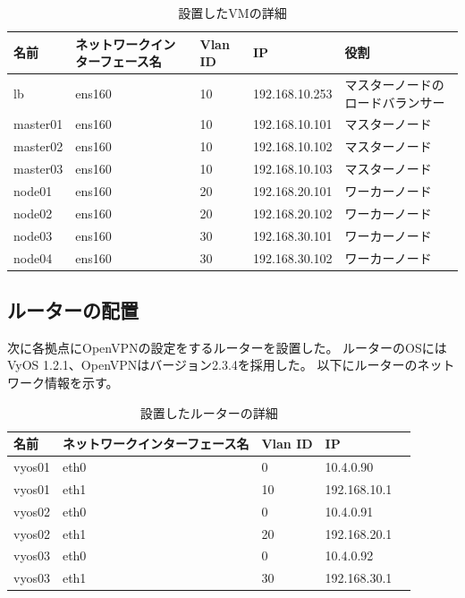 \begin{landscape}
  \begin{table}[htb]
    \begin{center}
      \caption{設置したVMの詳細}
      \begin{tabular}{|l|l|l|l|l|} \hline
        名前 & ネットワークインターフェース名 & Vlan ID & IP & 役割 \\ \hline
        lb & ens160 & 10 & 192.168.10.253 & マスターノードのロードバランサー \\ \hline
        master01 & ens160 & 10 & 192.168.10.101 & マスターノード \\ \hline
        master02 & ens160 & 10 & 192.168.10.102 & マスターノード \\ \hline
        master03 & ens160 & 10 & 192.168.10.103 & マスターノード \\ \hline
        node01 & ens160 & 20 & 192.168.20.101 & ワーカーノード \\ \hline
        node02 & ens160 & 20 & 192.168.20.102 & ワーカーノード \\ \hline
        node03 & ens160 & 30 & 192.168.30.101 & ワーカーノード \\ \hline
        node04 & ens160 & 30 & 192.168.30.102 & ワーカーノード \\ \hline
      \end{tabular}
    \end{center}
  \end{table}
\end{landscape}

\subsection{ルーターの配置}

次に各拠点にOpenVPNの設定をするルーターを設置した。
ルーターのOSにはVyOS 1.2.1、OpenVPNはバージョン2.3.4を採用した。
以下にルーターのネットワーク情報を示す。

\begin{table}[htb]
  \begin{center}
    \caption{設置したルーターの詳細}
    \begin{tabular}{|l|l|l|l|l|} \hline
      名前 & ネットワークインターフェース名 & Vlan ID & IP \\ \hline
      vyos01 & eth0 & 0 & 10.4.0.90 \\ \hline
      vyos01 & eth1 & 10 & 192.168.10.1 \\ \hline
      vyos02 & eth0 & 0 & 10.4.0.91 \\ \hline
      vyos02 & eth1 & 20 & 192.168.20.1 \\ \hline
      vyos03 & eth0 & 0 & 10.4.0.92 \\ \hline
      vyos03 & eth1 & 30 & 192.168.30.1 \\ \hline
    \end{tabular}
  \end{center}
\end{table}

